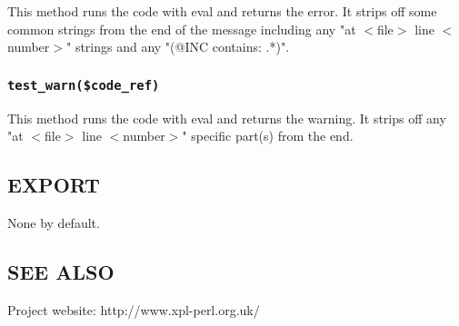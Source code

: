 This method runs the code with eval and returns the error.  It strips
off some common strings from the end of the message including any "at
$<$file$>$ line $<$number$>$" strings and any "(@INC contains: .*)".

\subsubsection*{\texttt{test\_warn(\$code\_ref)}\label{t::Helpers_test_warn_code_ref_}}


This method runs the code with eval and returns the warning.  It strips
off any "at $<$file$>$ line $<$number$>$" specific part(s) from the end.

\subsection*{EXPORT\label{t::Helpers_EXPORT}}


None by default.

\subsection*{SEE ALSO\label{t::Helpers_SEE_ALSO}}


Project website: http://www.xpl-perl.org.uk/

